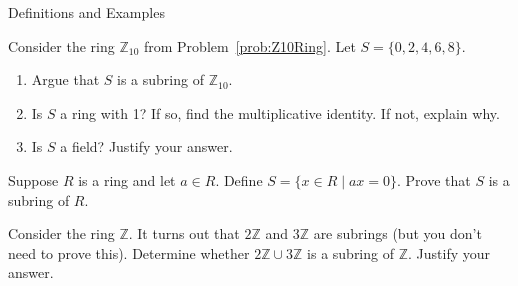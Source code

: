 \begin{section}{Definitions and Examples}
\begin{problem}
Consider the ring $\mathbb{Z}_{10}$ from Problem~\ref{prob:Z10Ring}. Let $S=\{0,2,4,6,8\}$.
\begin{enumerate}[label=\rm{(\alph*)}]
\item Argue that $S$ is a subring of $\mathbb{Z}_{10}$.
\item Is $S$ a ring with 1?  If so, find the multiplicative identity.  If not, explain why.
\item Is $S$ a field? Justify your answer.
\end{enumerate}
\end{problem}

\begin{problem}
Suppose $R$ is a ring and let $a\in R$.  Define $S=\{x\in R\mid ax=0\}$.  Prove that $S$ is a subring of $R$.
\end{problem}

\begin{problem}
Consider the ring $\mathbb{Z}$.  It turns out that $2\mathbb{Z}$ and $3\mathbb{Z}$ are subrings (but you don't need to prove this).  Determine whether $2\mathbb{Z}\cup 3\mathbb{Z}$ is a subring of $\mathbb{Z}$.  Justify your answer.
\end{problem}

\end{section}

